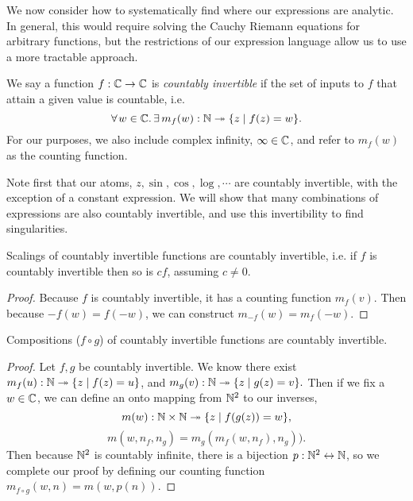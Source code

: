 
We now consider how to systematically find where our expressions are analytic.
In general, this would require solving the Cauchy Riemann equations for
arbitrary functions, but the restrictions of our expression language allow us
to use a more tractable approach.


\begin{definition}
  We say a function $f: \mathbb{C} \to \mathbb{C}$ is \emph{countably invertible} if the set
  of inputs to $f$ that attain a given value is countable, i.e.
  \[\forall w \in \CC \ldotp \exists m_f(w): \NN \twoheadrightarrow \{ z \mid f(z) = w \}. \]
  For our purposes, we also include complex infinity, $\infty \in \mathbb{C}$, and
  refer to $m_f(w)$ as the counting function.
\end{definition}

Note first that our atoms, $z, \sin, \cos, \log, \cdots$ are countably
invertible, with the exception of a constant expression. We will show that
many combinations of expressions are also countably invertible, and use
this invertibility to find singularities.

\begin{lemma}
  \label{lem:ci-scalings}
  Scalings of countably invertible functions are countably invertible, i.e.
  if $f$ is countably invertible then so is $cf$, assuming
  $c \neq 0$.
\end{lemma}
\begin{proof}
  Because $f$ is countably invertible, it has a counting function $m_f(v)$.
  Then because $-f(w) = f(-w)$, we can construct $m_{-f}(w) = m_f(-w)$.
\end{proof}

\begin{lemma}
  \label{lem:ci-compositions}
  Compositions ($f \circ g$) of countably invertible functions are
  countably invertible.
\end{lemma}
\begin{proof}
  Let $f, g$ be countably invertible. We know there exist
  $m_f(u): \mathbb{N} \twoheadrightarrow \{z \mid f(z) = u\}$, and
  $m_g(v): \mathbb{N} \twoheadrightarrow \{z \mid g(z) = v\}.$
  Then if we fix a $w \in \mathbb{C}$, we can define an onto mapping from $\mathbb{N}^2$ to
  our inverses,
  \[m(w): \mathbb{N} \times \mathbb{N} \twoheadrightarrow \{z \mid f(g(z)) = w\},\]
  \[m(w, n_f, n_g) = m_g(m_f(w, n_f), n_g)).\]
  Then because $\mathbb{N}^2$ is countably infinite, there is a bijection
  $p: \mathbb{N}^2 \leftrightarrow \mathbb{N}$, so we complete our proof by defining
  our counting function $m_{f \circ g}(w, n) = m(w, p(n)).$
\end{proof}

